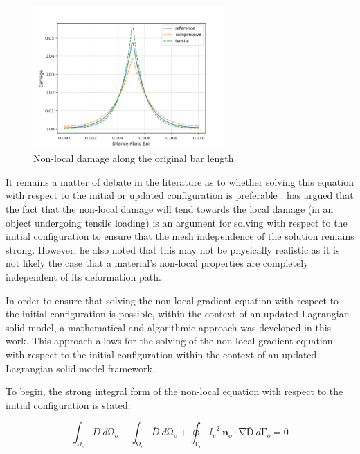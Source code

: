 \documentclass[sn-mathphys,Numbered,draft]{sn-jnl}%
\begin{document}
\begin{figure}[htb]
\begin{center}
	\includegraphics[width=0.65\textwidth]{./Figures/damageModels/compressiveTensileDamage.png}
\caption{Non-local damage along the original bar length}
\label{fig:compressiveTensileNonLocalDamage}
\end{center}
\end{figure}

It remains a matter of debate in the literature as to whether solving this equation with respect to the initial or updated configuration is preferable \cite{geers_strongly_2003}. \citet{steinmann_formulation_nodate} has argued that the fact that the non-local damage will tend towards the local damage (in an object undergoing tensile loading) is an argument for solving with respect to the initial configuration to ensure that the mesh independence of the solution remains strong. However, he also noted that this may not be physically realistic as it is not likely the case that a material's non-local properties are completely independent of its deformation path.

In order to ensure that solving the non-local gradient equation with respect to the initial configuration is possible, within the context of an updated Lagrangian solid model, a mathematical and algorithmic approach was developed in this work. This approach allows for the solving of the non-local gradient equation with respect to the initial configuration within the context of an updated Lagrangian solid model framework.

To begin, the strong integral form of the non-local equation with respect to the initial configuration is stated:

\begin{equation}
\label{eqn:stronFormNonLocal_URef}
\int_{\mathrm{\Omega}_o}D\ d\mathrm{\Omega}_o-\int_{\mathrm{\Omega}_o}\bar{D}\ d\mathrm{\Omega}_o+\oint_{\mathrm{\Gamma}_o}{{l_c}^2\ \mathbf{n}_o\cdot\mathrm{\nabla}\mathrm{\bar{D}}}\ d\mathrm{\Gamma}_o=0
\end{equation}
\end{document}
